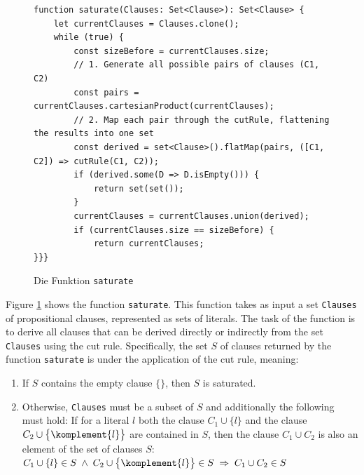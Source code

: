 \begin{figure}[!ht]
\centering
\begin{verbatim}
function saturate(Clauses: Set<Clause>): Set<Clause> {
    let currentClauses = Clauses.clone(); 
    while (true) {
        const sizeBefore = currentClauses.size;
        // 1. Generate all possible pairs of clauses (C1, C2)
        const pairs = currentClauses.cartesianProduct(currentClauses);
        // 2. Map each pair through the cutRule, flattening the results into one set
        const derived = set<Clause>().flatMap(pairs, ([C1, C2]) => cutRule(C1, C2));
        if (derived.some(D => D.isEmpty())) {
            return set(set());
        }
        currentClauses = currentClauses.union(derived);
        if (currentClauses.size == sizeBefore) {
            return currentClauses;
}}}
\end{verbatim}
\vspace*{-0.3cm}
\caption{Die Funktion \texttt{saturate}}
\label{fig:Completeness.ipynb-2}
\end{figure}
Figure \ref{fig:Completeness.ipynb-2} shows the function \texttt{saturate}. This function takes
as input a set \texttt{Clauses} of propositional clauses, represented as sets of literals.
The task of the function is to derive all clauses that can be derived directly or indirectly from the set \texttt{Clauses}
using the cut rule. Specifically, the set $S$ of clauses returned by the function \texttt{saturate}
is  under the application of the cut rule, meaning:

\begin{enumerate}
\item If $S$ contains the empty clause $\{\}$, then $S$ is saturated.
\item Otherwise, \texttt{Clauses} must be a subset of $S$ and additionally the following must hold:
      If for a literal $l$ both the clause $C_1 \cup \{ l \}$ and the clause $C_2 \cup
      \bigl\{ \komplement{l} \bigr\}$ are contained in $S$,
      then the clause $C_1 \cup C_2$ is also an element of the set of clauses $S$:
      \\[0.2cm]
      \hspace*{1.3cm}
      $C_1 \cup \{ l \} \in S \;\wedge\; C_2 \cup \bigl\{ \komplement{l} \bigr\} \in S \;\Rightarrow\; C_1 \cup C_2 \in S$
\end{enumerate}

